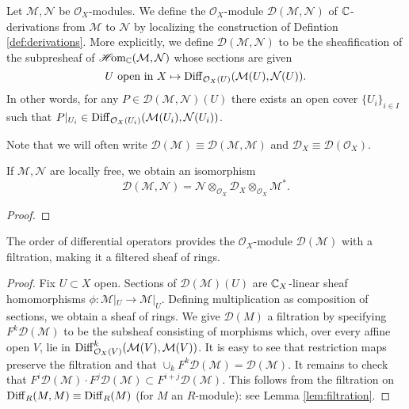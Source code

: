 \begin{definition}
    Let $\mathcal{M},\mathcal{N}$ be $\mathcal{O}_X$-modules. We define the
    $\mathcal{O}_X$-module $\mathscr{D}(\mathcal{M},\mathcal{N})$ of $\mathbb{C}$-derivations
    from $\mathcal{M}$ to $\mathcal{N}$ by localizing the construction of Defintion \ref{def:derivations}.
    More explicitly, we define $\mathscr{D}(\mathcal{M},\mathcal{N})$ to be
    the sheafification of the subpresheaf of $\operatorname{\mathscr{H}\!om}_{\mathbb{C}}(\mathcal{M},\mathcal{N})$
    whose sections are given 
    \[U\text{ open in } X \mapsto \operatorname{Diff}_{\mathcal{O}_X(U)}(\mathcal{M}(U),\mathcal{N}(U)).\]
    In other words, for any $P\in\mathscr{D}(\mathcal{M},\mathcal{N})(U)$ there exists an open
    cover $\{U_i\}_{i\in I}$ such that $P|_{U_i}\in\operatorname{Diff}_{\mathcal{O}_X(U_i)}(\mathcal{M}(U_i),\mathcal{N}(U_i))$.

    Note that we will often write $\mathscr{D}(\mathcal{M})\equiv\mathscr{D}(\mathcal{M,M})$ and
    $\mathscr{D}_X\equiv\mathscr{D}(\mathcal{O}_X)$.
    \label{def:D_X}
\end{definition}

\begin{proposition}
    If $\mathcal{M},\mathcal{N}$ are locally free, we obtain an isomorphism
    \[\mathscr{D}(\mathcal{M},\mathcal{N})=\mathcal{N}\otimes_{\mathcal{O}_X}\mathscr{D}_X\otimes_{\mathcal{O}_X}\mathcal{M}^*.\]
\end{proposition}
\begin{proof}
\end{proof}

\begin{lemma}
    The order of differential operators provides the $\mathcal{O}_X$-module $\mathscr{D}(\mathcal{M})$
    with a filtration, making it a filtered sheaf of rings.
    \label{lem:filter1}
\end{lemma}
\begin{proof}
    Fix $U\subset X$ open. Sections of $\mathscr{D}(\mathcal{M})(U)$ are $\mathbb{C}_X$-linear
    sheaf homomorphisms $\phi:\mathcal{M}|_U\to\mathcal{M}|_U$. Defining multiplication as composition
    of sections, we obtain a sheaf of rings. We give $\mathscr{D}(M)$ a filtration by specifying
    $F^k\mathscr{D}(\mathcal{M})$ to be the subsheaf consisting of morphisms which, over every affine
    open $V$, lie in $\operatorname{Diff}^k_{\mathcal{O}_X(V)}(\mathcal{M}(V),\mathcal{M}(V))$. It is easy to see
    that restriction maps preserve the filtration and that $\cup_kF^k\mathscr{D}(\mathcal{M})=\mathscr{D}(\mathcal{M})$.
    It remains to check that
    $F^i\mathscr{D}(\mathcal{M})\cdot F^j\mathscr{D}(\mathcal{M})\subset F^{i+j}\mathscr{D}(\mathcal{M})$.
    This follows from the filtration on $\operatorname{Diff}_R(M,M)\equiv\operatorname{Diff}_R(M)$ (for $M$ an $R$-module): see
    Lemma \ref{lem:filtration}.
\end{proof}

